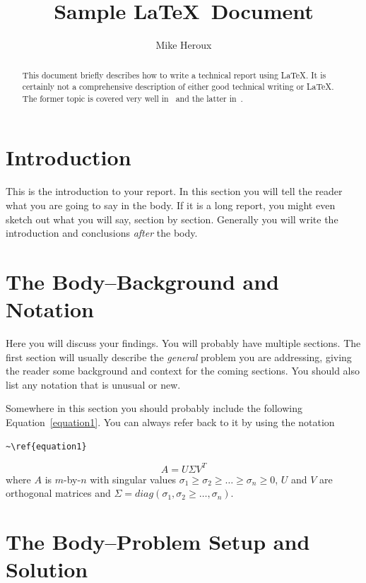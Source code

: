 \documentclass{IEEEtran}
\title{Sample \LaTeX\ Document}
\author{Mike Heroux}
\date{}
\begin{document}

\maketitle
\pagestyle{plain}

\begin{abstract}
This document briefly describes how to write a technical report using \LaTeX.  It is certainly not a comprehensive description of either good technical writing or \LaTeX.  The former topic is covered very well in~\cite{High93} and the latter in~\cite{Lamp86}.
\end{abstract}

\section{Introduction}

This is the introduction to your report.  In this section you will tell the reader what you are going to say in the body.  If it is a long report, you might even sketch out what you will say, section by section.  Generally you will write the introduction and conclusions {\it after} the body.

\section{The Body--Background and Notation}
Here you will discuss your findings.  You will probably have multiple sections.  The first section will usually describe the {\it general} problem you are addressing, giving the reader some background and context for the coming sections.  You should also list any notation that is unusual or new.

Somewhere in this section you should probably include the following Equation~\ref{equation1}.  You can always refer back to it by using the notation
\begin{verbatim}
~\ref{equation1}
\end{verbatim}

\begin{equation}
\label{equation1}
A = U \Sigma V^T
\end{equation}
where $A$ is $m$-by-$n$ with singular values $\sigma_1 \ge \sigma_2 \ge \ldots \ge \sigma_n \ge 0$, $U$ and $V$ are orthogonal matrices and $\Sigma = diag(\sigma_1,\sigma_2 \ge \ldots, \sigma_n)$.

\section{The Body--Problem Setup and Solution}
\end{document}
